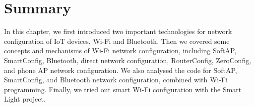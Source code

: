 \documentclass[a4paper,12pt]{book}
\begin{document}
\section{Summary}
In this chapter, we first introduced two important technologies for network configuration of IoT devices, Wi-Fi and Bluetooth. Then we covered some concepts and mechanisms of Wi-Fi network configuration, including SoftAP, SmartConfig, Bluetooth, direct network configuration, RouterConfig, ZeroConfig, and phone AP network configuration. We also analysed the code for SoftAP, SmartConfig, and Bluetooth network configuration, combined with Wi-Fi programming. Finally, we tried out smart Wi-Fi configuration with the Smart Light project.
\end{document}
